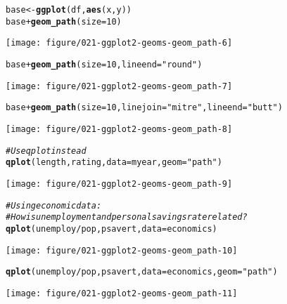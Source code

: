 \documentclass[a4paper,titlepage]{tufte-handout}\usepackage[]{graphicx}\usepackage[]{color}
\makeatletter
\def\maxwidth{ %
  \ifdim\Gin@nat@width>\linewidth
    \linewidth
  \else
    \Gin@nat@width
  \fi
}
\newcommand{\hlnum}[1]{\textcolor[rgb]{0.686,0.059,0.569}{#1}}%
\newcommand{\hlstr}[1]{\textcolor[rgb]{0.192,0.494,0.8}{#1}}%
\newcommand{\hlcom}[1]{\textcolor[rgb]{0.678,0.584,0.686}{\textit{#1}}}%
\newcommand{\hlopt}[1]{\textcolor[rgb]{0,0,0}{#1}}%
\newcommand{\hlstd}[1]{\textcolor[rgb]{0.345,0.345,0.345}{#1}}%
\newcommand{\hlkwb}[1]{\textcolor[rgb]{0.69,0.353,0.396}{#1}}%
\newcommand{\hlkwc}[1]{\textcolor[rgb]{0.333,0.667,0.333}{#1}}%
\newcommand{\hlkwd}[1]{\textcolor[rgb]{0.737,0.353,0.396}{\textbf{#1}}}%
\newenvironment{kframe}{%
 \def\at@end@of@kframe{}%
 \ifinner\ifhmode%
  \def\at@end@of@kframe{\end{minipage}}%
  \begin{minipage}{\columnwidth}%
 \fi\fi%
 \def\FrameCommand##1{\hskip\@totalleftmargin \hskip-\fboxsep
 \colorbox{shadecolor}{##1}\hskip-\fboxsep
     \hskip-\linewidth \hskip-\@totalleftmargin \hskip\columnwidth}%
 \MakeFramed {\advance\hsize-\width
   \@totalleftmargin\z@ \linewidth\hsize
   \@setminipage}}%
 {\par\unskip\endMakeFramed%
 \at@end@of@kframe}
\newenvironment{knitrout}{}{} %
\makeatother
\begin{document}
\begin{knitrout}
\begin{kframe}
\begin{alltt}
\hlstd{base} \hlkwb{<-} \hlkwd{ggplot}\hlstd{(df,} \hlkwd{aes}\hlstd{(x, y))}
\hlstd{base} \hlopt{+} \hlkwd{geom_path}\hlstd{(}\hlkwc{size} \hlstd{=} \hlnum{10}\hlstd{)}
\end{alltt}
\end{kframe}
\texttt{[image: figure/021-ggplot2-geoms-geom\_path-6]} 
\begin{kframe}\begin{alltt}
\hlstd{base} \hlopt{+} \hlkwd{geom_path}\hlstd{(}\hlkwc{size} \hlstd{=} \hlnum{10}\hlstd{,} \hlkwc{lineend} \hlstd{=} \hlstr{"round"}\hlstd{)}
\end{alltt}
\end{kframe}
\texttt{[image: figure/021-ggplot2-geoms-geom\_path-7]} 
\begin{kframe}\begin{alltt}
\hlstd{base} \hlopt{+} \hlkwd{geom_path}\hlstd{(}\hlkwc{size} \hlstd{=} \hlnum{10}\hlstd{,} \hlkwc{linejoin} \hlstd{=} \hlstr{"mitre"}\hlstd{,} \hlkwc{lineend} \hlstd{=} \hlstr{"butt"}\hlstd{)}
\end{alltt}
\end{kframe}
\texttt{[image: figure/021-ggplot2-geoms-geom\_path-8]} 
\begin{kframe}\begin{alltt}
\hlcom{# Use qplot instead}
\hlkwd{qplot}\hlstd{(length, rating,} \hlkwc{data}\hlstd{=myear,} \hlkwc{geom}\hlstd{=}\hlstr{"path"}\hlstd{)}
\end{alltt}
\end{kframe}
\texttt{[image: figure/021-ggplot2-geoms-geom\_path-9]} 
\begin{kframe}\begin{alltt}
\hlcom{# Using economic data:}
\hlcom{# How is unemployment and personal savings rate related?}
\hlkwd{qplot}\hlstd{(unemploy}\hlopt{/}\hlstd{pop, psavert,} \hlkwc{data}\hlstd{=economics)}
\end{alltt}
\end{kframe}
\texttt{[image: figure/021-ggplot2-geoms-geom\_path-10]} 
\begin{kframe}\begin{alltt}
\hlkwd{qplot}\hlstd{(unemploy}\hlopt{/}\hlstd{pop, psavert,} \hlkwc{data}\hlstd{=economics,} \hlkwc{geom}\hlstd{=}\hlstr{"path"}\hlstd{)}
\end{alltt}
\end{kframe}
\texttt{[image: figure/021-ggplot2-geoms-geom\_path-11]} 
\begin{kframe}\begin{alltt}

\end{alltt}
\end{kframe}
\end{knitrout}
\end{document}
